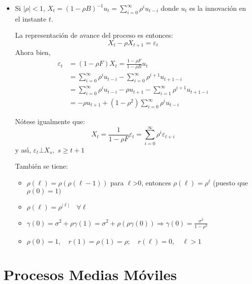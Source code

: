 \begin{ejemplo}
\begin{enumerate}
\begin{itemize}
\item Si $\left| \rho \right|<1$, $X_{t} =\left( {1-\rho B} \right)^{-1}u_{t} =\sum_{i=0}^\infty {\rho^{i}u_{t-i} } $
donde $u_{t} $ es la innovaci\'{o}n en el instante $t$.

La representaci\'{o}n de avance del proceso es entonces:
\[
X_{t} -\rho X_{t+1} =\varepsilon_{t} 
\]
Ahora bien, 
\begin{align*}
\varepsilon_{t} 
	&=\left( {1-\rho F} \right)X_{t} =\frac{1-\rho F}{1-\rho B}u_{t} \\
	&=\sum_{i=0}^\infty \rho^{i}u_{t-i} -\sum_{i=0}^\infty \rho ^{i+1}u_{t+1-i}\\
	&=\sum_{i=0}^\infty \rho^{i}u_{t-i} -\rho u_{t+1} -\sum_{i=1}^\infty \rho^{i+1}u_{t+1-i}\\
	&=-\rho u_{t+1} +\left( {1-\rho^{2}} \right)\sum_{i=0}^\infty {\rho^{i}u_{t-i} }   
\end{align*}

N\'{o}tese igualmente que: 
\[
X_{t} =\frac{1}{1-\rho F}\varepsilon_{t} =\sum_{i=0}^\infty {\rho 
^{i}\varepsilon_{t+i} } 
\]
y as\'{\i}, $\varepsilon_{t} \bot X_{s} ,$ $s\ge t+1$

Tambi\'{e}n se tiene:
\begin{itemize}
\item $\rho \left( \ell \right)=\rho \left( {\rho \left( {\ell -1} \right)} 
\right)$ para $\ell $\textgreater 0, entonces $\rho \left( \ell \right)=\rho 
^{\ell }$ (puesto que $\rho \left( 0 \right)=1)$

\item $\rho \left( \ell \right)=\rho^{\left| \ell \right|}
\quad
\forall \ell $

\item $\gamma \left( 0 \right)=\sigma^{2}+\rho \gamma \left( 1 \right)=\sigma 
^{2}+\rho \left( {\rho \gamma \left( 0 \right)} \right)\Rightarrow \gamma 
\left( 0 \right)=\frac{\sigma^{2}}{1-\rho^{2}}$

\item $\rho \left( 0 \right)=1,
\quad
r\left( 1 \right)=\rho \left( 1 \right)=\rho ;
\quad
r\left( \ell \right)=0,
\quad
\ell >1
$
\end{itemize}
\end{itemize}
\end{enumerate}

\end{ejemplo}

\section{Procesos Medias M\'{o}viles}


